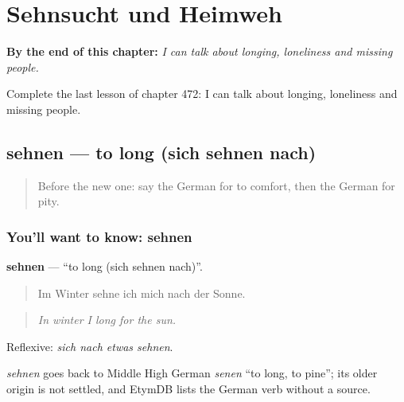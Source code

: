 
\chapter{Sehnsucht und Heimweh}
\label{ch:ge-sehnsucht-und-heimweh}

\begin{chapteropening}
\textbf{By the end of this chapter:} \emph{I can talk about longing, loneliness and missing people.}

Complete the last lesson of chapter 472: I can talk about longing, loneliness and missing people.
\end{chapteropening}

\section[sehnen]{sehnen — to long (sich sehnen nach)}

\label{lesson:GE-C472-sehnen}



\begin{quote}
Before the new one: say the German for to comfort, then the German for pity.
\end{quote}

\subsection*{You'll want to know: sehnen}
\textbf{sehnen} — \textquotedblleft{}to long (sich sehnen nach)\textquotedblright{}.

\begin{quote}
Im Winter sehne ich mich nach der Sonne.
\end{quote}

\begin{quote}
\emph{In winter I long for the sun.}
\end{quote}

Reflexive: \emph{sich nach etwas sehnen}.

\begin{cousinweb}
\emph{sehnen} goes back to Middle High German \emph{senen} \textquotedblleft{}to long, to pine\textquotedblright{}; its older origin is not settled, and EtymDB lists the German verb without a source.
\end{cousinweb}

